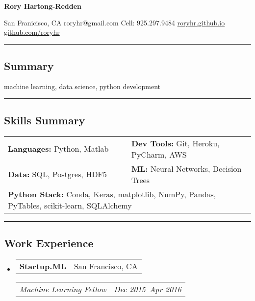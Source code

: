 \documentclass[10pt,letterpaper]{article}
\makeatletter
\newenvironment{indentsection}[1]%
{\begin{list}{}%
	{\setlength{\leftmargin}{#1}}%
	\item[]%
}
{\end{list}}
\newcommand{\headerrow}[2]
{\begin{tabular*}{\linewidth}{l@{\extracolsep{\fill}}r}
	#1 &
	#2 \\
\end{tabular*}}
\makeatother
\begin{document}
{\raggedright \LARGE \bf Rory Hartong-Redden\\}

{\raggedleft 
San Franicisco, CA \textbar\/ 
roryhr@gmail.com \textbar\/ 
Cell: 925.297.9484 \textbar\/ 
\href{roryhr.github.io}{roryhr.github.io} \textbar\/   
\href{https://github.com/roryhr}{github.com/roryhr}\\}
\hrule

\subsection*{Summary}
\begin{centering}  
machine learning, data science, python development\\

\end{centering}

\hrule
\subsection*{Skills Summary}
\begin{indentsection}{\parindent}
\begin{tabular}{p{0.5\linewidth}   p{0.5\linewidth} } 
	\textbf{Languages:}  Python, Matlab 	
	& \textbf{Dev Tools:}  Git, Heroku, PyCharm, AWS \\  

	\textbf{Data:} SQL, Postgres, HDF5
	& \textbf{ML:} Neural Networks, Decision Trees  \\
	
	\multicolumn{2}{l}{\textbf{Python Stack:} Conda, Keras, matplotlib, NumPy, Pandas, PyTables, scikit-learn, SQLAlchemy} \\
\end{tabular}
\end{indentsection}

\hrule
\subsection*{Work Experience}
\begin{itemize}
	\parskip=-0.1em
	\item
	\headerrow
		{\textbf{Startup.ML}}
		{San Francisco, CA}
	\headerrow
		{\emph{Machine Learning Fellow}}
		{\emph{Dec 2015--Apr 2016}}
\end{itemize}
\end{document}
